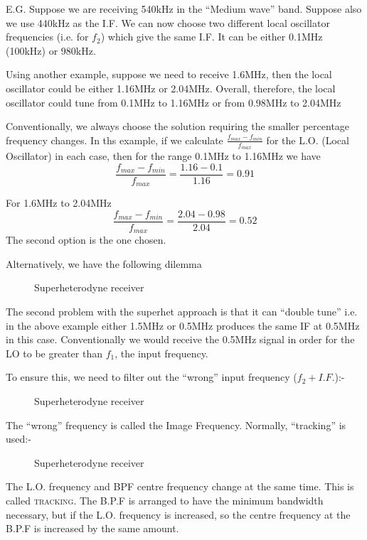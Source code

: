 \documentclass[11pt]{article} %
\begin{document}
	E.G. Suppose we are receiving 540kHz in the ``Medium wave'' band. Suppose also we use 440kHz as the I.F. We can now choose two different local oscillator frequencies (i.e. for $f_2$) which give the same I.F. 
	It can be either 0.1MHz (100kHz) or 980kHz.

	Using another example, suppose we need to receive 1.6MHz, then the local oscillator could be either 1.16MHz or 2.04MHz. Overall, therefore, the local oscillator could tune from 0.1MHz to 1.16MHz or from 0.98MHz to 2.04MHz

	Conventionally, we always choose the solution requiring the smaller percentage frequency changes. In ths example, if we calculate $\frac{f_{max}-f_{min}}{f_{max}}$ for the L.O. 
	(Local Oscillator) in each case, then for the range 0.1MHz to 1.16MHz we have
	\begin{equation}
		\frac{f_{max}-f_{min}}{f_{max}} = \frac{1.16-0.1}{1.16} = 0.91
	\end{equation}

	For 1.6MHz to 2.04MHz
	\begin{equation}
		\frac{f_{max}-f_{min}}{f_{max}} = \frac{2.04-0.98}{2.04} = 0.52
	\end{equation}
	The second option is the one chosen.

	Alternatively, we have the following dilemma
	\begin{figure}[h]
		\centering
		\begin{tikzpicture}
		\end{tikzpicture}
		\label{fig:superhetex}
		\caption{Superheterodyne receiver}
	\end{figure}

	The second problem with the superhet approach is that it can ``double tune'' i.e. in the above example either 1.5MHz or 0.5MHz produces the same IF at 0.5MHz in this case.
	Conventionally we would receive the 0.5MHz signal in order for the LO to be greater than $f_1$, the input frequency.

	To ensure this, we need to filter out the ``wrong'' input frequency ($f_2+I.F.$):-
	\begin{figure}[h]
		\centering
		\begin{tikzpicture}
		\end{tikzpicture}
		\label{fig:superhetbpf}
		\caption{Superheterodyne receiver}
	\end{figure}

	The ``wrong'' frequency is called the Image Frequency. Normally, ``tracking'' is used:-
	\begin{figure}[h]
		\centering
		\begin{tikzpicture}
		\end{tikzpicture}
		\label{fig:superhettracking}
		\caption{Superheterodyne receiver}
	\end{figure}

	The L.O. frequency and BPF centre frequency change at the same time. This is called \textsc{tracking}. The B.P.F is arranged to have the minimum bandwidth necessary, but if the L.O. frequency is increased, so the centre frequency at the B.P.F is increased by the same amount.
\end{document}

